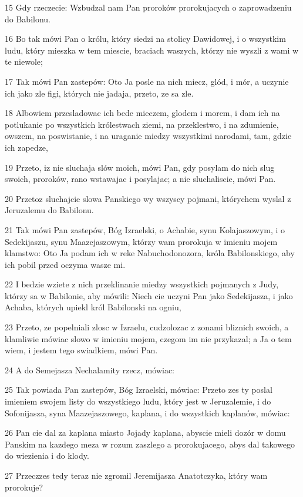 \par 15 Gdy rzeczecie: Wzbudzal nam Pan proroków prorokujacych o zaprowadzeniu do Babilonu.
\par 16 Bo tak mówi Pan o królu, który siedzi na stolicy Dawidowej, i o wszystkim ludu, który mieszka w tem miescie, braciach waszych, którzy nie wyszli z wami w te niewole;
\par 17 Tak mówi Pan zastepów: Oto Ja posle na nich miecz, glód, i mór, a uczynie ich jako zle figi, których nie jadaja, przeto, ze sa zle.
\par 18 Albowiem przesladowac ich bede mieczem, glodem i morem, i dam ich na potlukanie po wszystkich królestwach ziemi, na przeklestwo, i na zdumienie, owszem, na poswistanie, i na uraganie miedzy wszystkimi narodami, tam, gdzie ich zapedze,
\par 19 Przeto, iz nie sluchaja slów moich, mówi Pan, gdy posylam do nich slug swoich, proroków, rano wstawajac i posylajac; a nie sluchaliscie, mówi Pan.
\par 20 Przetoz sluchajcie slowa Panskiego wy wszyscy pojmani, którychem wyslal z Jeruzalemu do Babilonu.
\par 21 Tak mówi Pan zastepów, Bóg Izraelski, o Achabie, synu Kolajaszowym, i o Sedekijaszu, synu Maazejaszowym, którzy wam prorokuja w imieniu mojem klamstwo: Oto Ja podam ich w reke Nabuchodonozora, króla Babilonskiego, aby ich pobil przed oczyma wasze mi.
\par 22 I bedzie wziete z nich przeklinanie miedzy wszystkich pojmanych z Judy, którzy sa w Babilonie, aby mówili: Niech cie uczyni Pan jako Sedekijasza, i jako Achaba, których upiekl król Babilonski na ogniu,
\par 23 Przeto, ze popelniali zlosc w Izraelu, cudzolozac z zonami bliznich swoich, a klamliwie mówiac slowo w imieniu mojem, czegom im nie przykazal; a Ja o tem wiem, i jestem tego swiadkiem, mówi Pan.
\par 24 A do Semejasza Nechalamity rzecz, mówiac:
\par 25 Tak powiada Pan zastepów, Bóg Izraelski, mówiac: Przeto zes ty poslal imieniem swojem listy do wszystkiego ludu, który jest w Jeruzalemie, i do Sofonijasza, syna Maazejaszowego, kaplana, i do wszystkich kaplanów, mówiac:
\par 26 Pan cie dal za kaplana miasto Jojady kaplana, abyscie mieli dozór w domu Panskim na kazdego meza w rozum zaszlego a prorokujacego, abys dal takowego do wiezienia i do klody.
\par 27 Przeczzes tedy teraz nie zgromil Jeremijasza Anatotczyka, który wam prorokuje?

